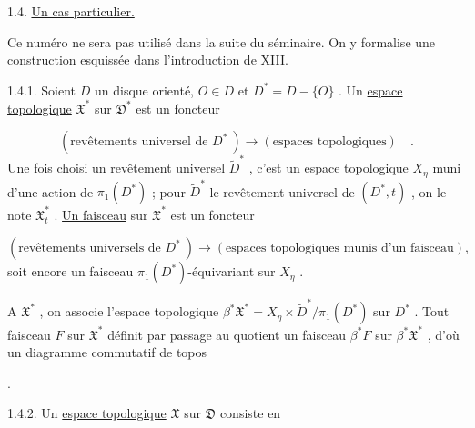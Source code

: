 1.4. \underline{Un cas particulier.}

Ce numéro ne sera pas utilisé dans la suite du séminaire. On y formalise une
construction esquissée dans l'introduction de XIII.

1.4.1. Soient $D$ un disque orienté, $O \in D$ et $D^* = D-\{O\}$ . Un \underline{espace topologique} $\mathfrak{X}^*$ sur $\mathfrak{D}^*$ est un foncteur

\begin{equation*}
(\mbox{revêtements universel de } D^*\ ) \longrightarrow (\mbox{espaces topologiques}) \quad .
\end{equation*}
Une fois choisi un revêtement universel $\widetilde{D}^*$ , c'est un espace topologique $X_\eta$ muni d'une action de $\pi_1(D^*)$ ; pour $\widetilde{D}^*$ le revêtement universel de $(D^*, t)$ , on le note $\mathfrak{X}^*_t$ . \underline{Un faisceau} sur $\mathfrak{X}^*$ est un foncteur

\begin{equation*}
(\mbox{revêtements universels de } D^*\ ) \longrightarrow (\mbox{espaces topologiques munis d'un faisceau}),
\end{equation*}
soit encore un faisceau $\pi_1(D^*)$-équivariant sur $X_\eta$ .

A $\mathfrak{X}^*$ , on associe l'espace topologique $\beta^* \mathfrak{X}^* = X_\eta \times \widetilde{D}^*/\pi_1(D^*)$ sur $D^*$ . Tout faisceau $F$ sur $\mathfrak{X}^*$ définit par passage au quotient un faisceau $\beta^*F$ sur $\beta^* \mathfrak{X}^*$ , d'où un diagramme commutatif de topos

\begin{center}
\quad .
\end{center}
1.4.2. Un \underline{espace topologique} $\mathfrak{X}$ sur $\mathfrak{D}$ consiste en

